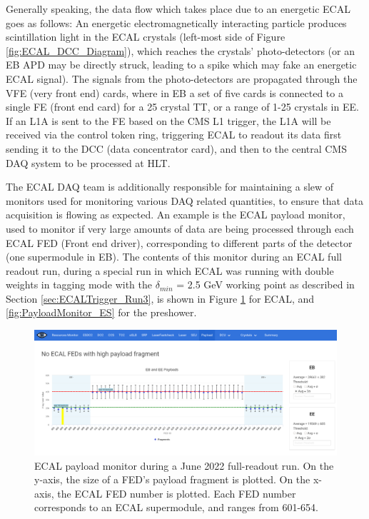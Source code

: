 Generally speaking, the data flow which takes place due to an energetic ECAL goes as follows: An energetic electromagnetically interacting particle produces scintillation light in the ECAL crystals (left-most side of Figure \ref{fig:ECAL_DCC_Diagram}), which reaches the crystals' photo-detectors (or an EB APD may be directly struck, leading to a spike which may fake an energetic ECAL signal). The signals from the photo-detectors are propagated through the VFE (very front end) cards, where in EB a set of five cards is connected to a single FE (front end card) for a 25 crystal TT, or a range of 1-25 crystals in EE. If an L1A is sent to the FE based on the CMS L1 trigger, the L1A will be received via the control token ring, triggering ECAL to readout its data first sending it to the DCC (data concentrator card), and then to the central CMS DAQ system to be processed at HLT. 

The ECAL DAQ team is additionally responsible for maintaining a slew of monitors used for monitoring various DAQ related quantities, to ensure that data acquisition is flowing as expected. An example is the ECAL payload monitor, used to monitor if very large amounts of data are being processed through each ECAL FED (Front end driver), corresponding to different parts of the detector (one supermodule in EB). The contents of this monitor during an ECAL full readout run, during a special run in which ECAL was running with double weights in tagging mode with the $\delta_{min}$ = 2.5 GeV working point as described in Section \ref{sec:ECALTrigger_Run3}, is shown in Figure \ref{fig:PayloadMonitor_ECAL} for ECAL, and \ref{fig:PayloadMonitor_ES} for the preshower.

\begin{figure}[H]
    \centering
    \includegraphics[width=\textwidth]{Images/ECAL_Operations/PayloadMonitor.png}
    \caption{ECAL payload monitor during a June 2022 full-readout run. On the y-axis, the size of a FED's payload fragment is plotted. On the x-axis, the ECAL FED number is plotted. Each FED number corresponds to an ECAL supermodule, and ranges from 601-654.}
    \label{fig:PayloadMonitor_ECAL}
\end{figure}

